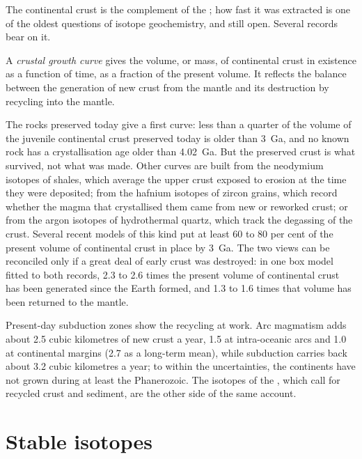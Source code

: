 The continental crust is the complement of the ; how fast it was
extracted is one of the oldest questions of isotope geochemistry, and still
open. Several records bear on it.

\begin{definition}\label{def:b2:isotope-geochemistry:growth}
A \emph{crustal growth curve} gives the volume, or
mass, of continental crust in existence as a function of time, as a fraction of
the present volume. It reflects the balance between the generation of new crust
from the mantle and its destruction by recycling into the mantle.
\end{definition}

The rocks preserved today give a first curve: less than a quarter of the volume
of the juvenile continental crust preserved today is older than \qty{3}{Ga}, and
no known rock has a crystallisation age older than \qty{4.02}{Ga}. But the
preserved crust is what survived, not what was made. Other curves are built from
the neodymium isotopes of shales, which average the upper crust exposed to
erosion at the time they were deposited; from the hafnium isotopes of zircon
grains, which record whether the magma that crystallised them came from new or
reworked crust; or from the argon isotopes of hydrothermal quartz, which track
the degassing of the crust. Several recent models of this kind put at least 60
to 80 per cent of the present volume of continental crust in place by
\qty{3}{Ga}. The two views can be reconciled only if a great deal of early crust
was destroyed: in one box model fitted to both records, 2.3 to 2.6 times the
present volume of continental crust has been generated since the Earth formed,
and 1.3 to 1.6 times that volume has been returned to the mantle.

Present-day subduction zones show the recycling at work. Arc magmatism adds
about 2.5 cubic kilometres of new crust a year, 1.5 at intra-oceanic arcs and
1.0 at continental margins (2.7 as a long-term mean), while subduction carries
back about 3.2 cubic kilometres a year; to within the uncertainties, the
continents have not grown during at least the Phanerozoic. The isotopes of the , which call for recycled crust and sediment, are the other side of
the same account.

\section{Stable isotopes}

